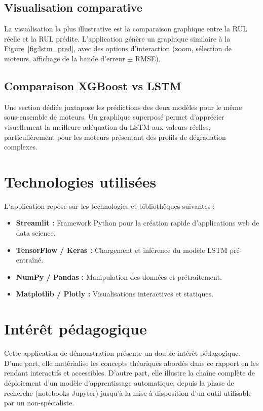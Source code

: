 \documentclass[12pt,a4paper]{report}
\theoremstyle{definition}
\begin{document}
\subsection{Visualisation comparative}

La visualisation la plus illustrative est la comparaison graphique entre la RUL réelle et la RUL prédite. L'application génère un graphique similaire à la Figure~\ref{fig:lstm_pred}, avec des options d'interaction (zoom, sélection de moteurs, affichage de la bande d'erreur $\pm$ RMSE).

\subsection{Comparaison XGBoost vs LSTM}

Une section dédiée juxtapose les prédictions des deux modèles pour le même sous-ensemble de moteurs. Un graphique superposé permet d'apprécier visuellement la meilleure adéquation du LSTM aux valeurs réelles, particulièrement pour les moteurs présentant des profils de dégradation complexes.

\section{Technologies utilisées}

L'application repose sur les technologies et bibliothèques suivantes :
\begin{itemize}
    \item \textbf{Streamlit :} Framework Python pour la création rapide d'applications web de data science.
    \item \textbf{TensorFlow / Keras :} Chargement et inférence du modèle LSTM pré-entraîné.
    \item \textbf{NumPy / Pandas :} Manipulation des données et prétraitement.
    \item \textbf{Matplotlib / Plotly :} Visualisations interactives et statiques.
\end{itemize}

\section{Intérêt pédagogique}

Cette application de démonstration présente un double intérêt pédagogique. D'une part, elle matérialise les concepts théoriques abordés dans ce rapport en les rendant interactifs et accessibles. D'autre part, elle illustre la chaîne complète de déploiement d'un modèle d'apprentissage automatique, depuis la phase de recherche (notebooks Jupyter) jusqu'à la mise à disposition d'un outil utilisable par un non-spécialiste.
\end{document}
